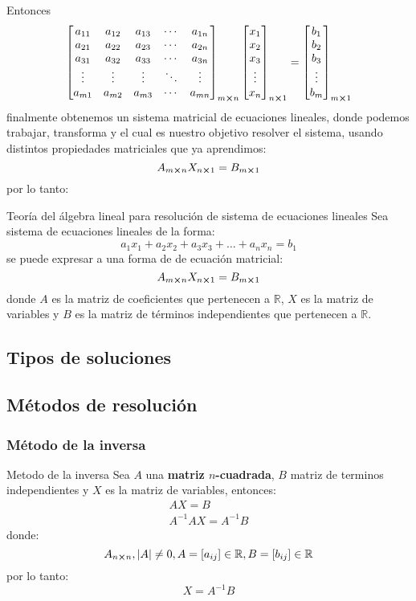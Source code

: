 Entonces
$$
	\begin{bmatrix}
		a_{11}&a_{12}&a_{13}&\cdots&a_{1n}\\
		a_{21}&a_{22}&a_{23}&\cdots&a_{2n}\\
		a_{31}&a_{32}&a_{33}&\cdots&a_{3n}\\
		\vdots&\vdots&\vdots&\ddots&\vdots\\
		a_{m1}&a_{m2}&a_{m3}&\cdots&a_{mn}\\
	\end{bmatrix}_{m\cross n}\begin{bmatrix}
		x_1\\
		x_2\\
		x_3\\
		\vdots\\
		x_n
	\end{bmatrix}_{n\cross 1}=\begin{bmatrix}
		b_1\\
		b_2\\
		b_3\\
		\vdots\\
		b_m
	\end{bmatrix}_{m\cross 1}
$$
finalmente obtenemos un sistema matricial de ecuaciones lineales, donde podemos trabajar, transforma y el cual es nuestro objetivo resolver el sistema, usando distintos propiedades matriciales que ya aprendimos:
$$ A_{m\cross n}X_{n\cross 1} = B_{m\cross 1} $$
por lo tanto:
\begin{Theorem*} {Teoría del álgebra lineal para resolución de sistema de ecuaciones lineales}
	Sea sistema de ecuaciones lineales de la forma:
	$$ a_1x_1+a_2x_2+a_3x_3+\dots+a_nx_n=b_1 $$
	se puede expresar a una forma de de ecuación matricial:
	$$ A_{m\cross n}X_{n\cross 1} = B_{m\cross 1} $$
	donde $A$ es la matriz de coeficientes que pertenecen a $\mathbb{R}$, $X$ es la matriz de variables y $B$ es la matriz de términos independientes que pertenecen a $\mathbb{R}$.
\end{Theorem*}
\subsection*{Tipos de soluciones}
\subsection*{Métodos de resolución}
\subsubsection*{Método de la inversa}
\begin{Theorem*} {Metodo de la inversa}
	Sea $A$ una \textbf{matriz $n$-cuadrada}, $B$ matriz de terminos independientes y $X$ es la matriz de variables, entonces:
	\begin{gather*}
		AX=B\\
		A^{-1}AX=A^{-1}B
	\end{gather*}
	donde:
	$$ A_{n\cross n}, |A|\ne 0, A=[a_{ij}] \in \mathbb{R}, B=[b_{ij}] \in \mathbb{R} $$
	por lo tanto:
	$$ X=A^{-1}B $$
\end{Theorem*}
